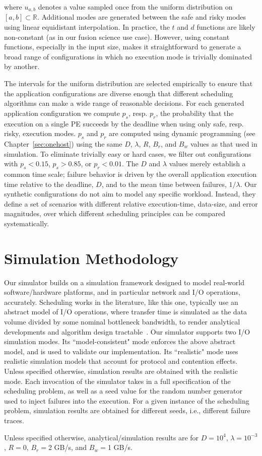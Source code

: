 \noindent
where $u_{a,b}$ denotes a value sampled once from the uniform distribution 
on $[a,b] \subset \mathbb{R}$.  Additional modes are generated between the safe and risky
modes using linear equidistant interpolation. In practice, the $t$ and $d$
functions are likely non-constant (as in our fusion science use
case). However, using constant functions, especially in the input size,
makes it straightforward to generate a broad range of configurations
in which no execution mode is trivially dominated by another.

The intervals for the uniform distribution are selected empirically
to ensure that the application configurations are diverse enough that
different scheduling algorithms can make a wide range of reasonable
decisions.  For each generated application configuration we
compute $p_s$, resp. $p_r$, the probability that the execution on a single
PE succeeds by the deadline when using only safe, resp. risky, execution
modes.  $p_s$ and $p_r$ are computed using dynamic programming (see
Chapter~\ref{sec:onehost}) using the same $D$, $\lambda$, $R$, $B_r$, and
$B_w$ values as that used in simulation.  To eliminate trivially easy or
hard cases, we filter out configurations with $p_s{<}0.15$, $p_s{>}0.85$,
or $p_r{<}0.01$.  The $D$ and $\lambda$ values merely establish a common
time scale; failure behavior is driven by the overall application
execution time relative to the deadline, $D$, and to the mean time between failures,
$1/\lambda$.  Our synthetic configurations do not aim to model any
specific workload. Instead, they define a set of scenarios with different
relative execution-time, data-size, and error magnitudes,  over which
different scheduling principles can be compared systematically.


\section{Simulation Methodology}

Our simulator builds on a simulation framework designed to model real-world
software/hardware platforms, and in particular network and I/O operations,
accurately.  Scheduling works in the literature, like this one, typically
use an abstract model of I/O operations, where transfer time is simulated as
the data volume divided by some nominal bottleneck bandwidth, to render
analytical developments and algorithm design
tractable~\cite{10.1145/2501654.2501664, 7965082}. Our simulator supports
two I/O simulation modes.  Its ``model-consistent" mode enforces the above
abstract model, and is used to validate our implementation. Its
``realistic" mode uses realistic simulation models that account for
protocol and contention effects.  Unless specified otherwise, simulation
results are obtained with the realistic mode.  Each invocation of the
simulator takes in a full specification of the scheduling problem, as well
as a seed value for the random number generator used to inject failures
into the execution.  For a given instance of the scheduling problem,
simulation results are obtained for different seeds, i.e., different
failure traces.

Unless specified otherwise, analytical/simulation results are 
for $D{=}10^4$, $\lambda{=}10^{-3}$, $R{=}0$, $B_r{=}$2 GB/s, and $B_w{=}$1 GB/s.


